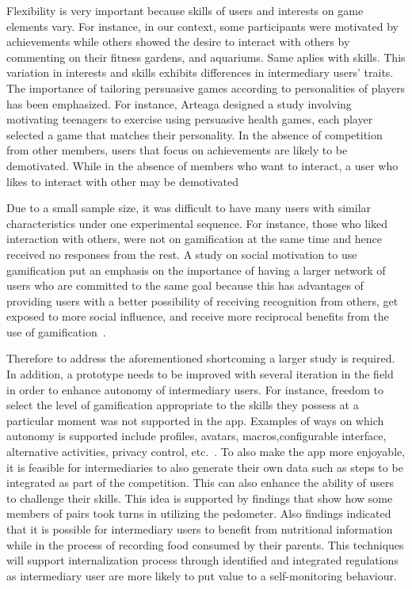\documentclass{sig-alternate}
\begin{document}
Flexibility is very important because skills of users and interests on game elements vary. For instance,  in our context, some participants were motivated by achievements while others showed the desire to interact with others by commenting on their fitness gardens, and aquariums. Same aplies with skills. This variation in interests and skills exhibits differences in intermediary users' traits. The importance of tailoring persuasive games according to personalities of players has been emphasized\cite{orji2013:tailoring}. For instance, Arteaga \cite{arteaga2010:persuasive} designed a study involving motivating teenagers to exercise using persuasive health games, each player selected a game that matches their personality. In the absence of competition from other members, users that focus  on achievements are likely to be demotivated. While in the absence of members who want to interact, a user who likes to interact with other may be demotivated

Due to a small sample size, it was difficult to have many users with similar characteristics under one experimental sequence. For instance, those who liked interaction with others, were not on gamification at the same time and hence received no responses from the rest. A study on social motivation to use gamification put an emphasis on the importance of having a larger network of users who are committed to the same goal because this has advantages of providing users with a better possibility of receiving recognition from others, get exposed to more social influence, and receive more reciprocal benefits from the use of gamification~\cite{hamari2013social}.

Therefore to address the aforementioned shortcoming a larger study is required. In addition, a prototype needs to be improved with several iteration in the field in order to enhance autonomy of intermediary users. For instance, freedom to select the level of gamification appropriate to the skills they possess at a particular moment was not supported in the app. Examples of ways on which autonomy is supported include profiles, avatars, macros,configurable interface, alternative activities, privacy control, etc.~\cite{francisco2012analysis}. To also make the app more enjoyable, it is feasible for intermediaries to also generate their own data such as steps to be integrated as part of the competition. This can also enhance the ability of users to challenge their skills. This idea is supported by findings that show how some members of pairs took turns in utilizing the pedometer. Also findings indicated that it is possible for intermediary users to benefit from nutritional information while in the process of recording food consumed by their parents. This techniques will support internalization process through identified and integrated regulations as intermediary user are more likely to put value to a self-monitoring behaviour.
\end{document}

